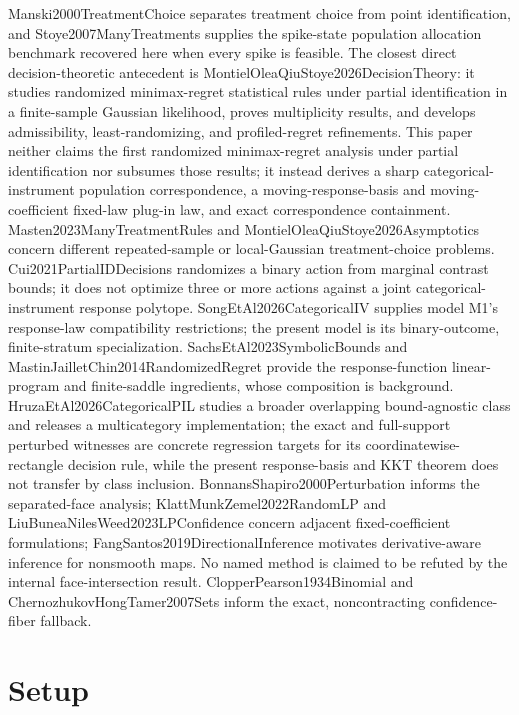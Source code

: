 \documentclass{article}
\begin{document}
Manski2000TreatmentChoice separates treatment choice from point identification, and Stoye2007ManyTreatments supplies the spike-state population allocation benchmark recovered here when every spike is feasible.  The closest direct decision-theoretic antecedent is MontielOleaQiuStoye2026DecisionTheory: it studies randomized minimax-regret statistical rules under partial identification in a finite-sample Gaussian likelihood, proves multiplicity results, and develops admissibility, least-randomizing, and profiled-regret refinements.  This paper neither claims the first randomized minimax-regret analysis under partial identification nor subsumes those results; it instead derives a sharp categorical-instrument population correspondence, a moving-response-basis and moving-coefficient fixed-law plug-in law, and exact correspondence containment.  Masten2023ManyTreatmentRules and MontielOleaQiuStoye2026Asymptotics concern different repeated-sample or local-Gaussian treatment-choice problems.  Cui2021PartialIDDecisions randomizes a binary action from marginal contrast bounds; it does not optimize three or more actions against a joint categorical-instrument response polytope.  SongEtAl2026CategoricalIV supplies model M1's response-law compatibility restrictions; the present model is its binary-outcome, finite-stratum specialization.  SachsEtAl2023SymbolicBounds and MastinJailletChin2014RandomizedRegret provide the response-function linear-program and finite-saddle ingredients, whose composition is background.  HruzaEtAl2026CategoricalPIL studies a broader overlapping bound-agnostic class and releases a multicategory implementation; the exact and full-support perturbed witnesses are concrete regression targets for its coordinatewise-rectangle decision rule, while the present response-basis and KKT theorem does not transfer by class inclusion.  BonnansShapiro2000Perturbation informs the separated-face analysis; KlattMunkZemel2022RandomLP and LiuBuneaNilesWeed2023LPConfidence concern adjacent fixed-coefficient formulations; FangSantos2019DirectionalInference motivates derivative-aware inference for nonsmooth maps.  No named method is claimed to be refuted by the internal face-intersection result.  ClopperPearson1934Binomial and ChernozhukovHongTamer2007Sets inform the exact, noncontracting confidence-fiber fallback.

\section{Setup}
\end{document}
